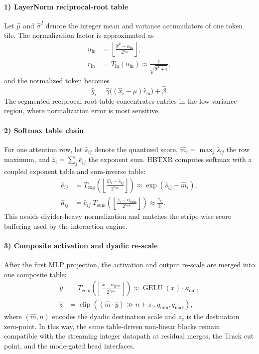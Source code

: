 \documentclass[journal]{IEEEtran}
\begin{document}
\paragraph*{1) LayerNorm reciprocal-root table}
Let $\hat{\mu}$ and $\hat{\sigma}^2$ denote the integer mean and variance accumulators of one token tile. The normalization factor is approximated as
\begin{align}
u_{\mathrm{ln}} &= \left\lfloor \frac{\hat{\sigma}^2-\alpha_{\mathrm{ln}}}{2^{s_{\mathrm{ln}}}} \right\rfloor,\\
\hat r_{\mathrm{ln}} &= T_{\mathrm{ln}}(u_{\mathrm{ln}})
\approx \frac{1}{\sqrt{\hat{\sigma}^2+\epsilon}},
\end{align}
and the normalized token becomes
\begin{equation}
\hat y_i = \hat\gamma \big((\hat x_i-\hat\mu)\hat r_{\mathrm{ln}}\big) + \hat\beta.
\end{equation}
The segmented reciprocal-root table concentrates entries in the low-variance region, where normalization error is most sensitive.

\paragraph*{2) Softmax table chain}
For one attention row, let $\hat s_{ij}$ denote the quantized score, $\hat m_i=\max_j\hat s_{ij}$ the row maximum, and $\hat z_i=\sum_j \hat e_{ij}$ the exponent sum. HBTXR computes softmax with a coupled exponent table and sum-inverse table:
\begin{align}
\hat e_{ij} &=
T_{\exp}\!\left(
\left\lfloor \frac{\hat m_i-\hat s_{ij}}{2^{s_{\exp}}}\right\rfloor
\right)
\approx \exp(\hat s_{ij}-\hat m_i),\\
\hat a_{ij} &= \hat e_{ij}\;
T_{\mathrm{sum}}\!\left(
\left\lfloor \frac{\hat z_i-\alpha_{\mathrm{sum}}}{2^{s_{\mathrm{sum}}}} \right\rfloor
\right)
\approx \frac{\hat e_{ij}}{\hat z_i}.
\end{align}
This avoids divider-heavy normalization and matches the stripe-wise score buffering used by the interaction engine.

\paragraph*{3) Composite activation and dyadic re-scale}
After the first MLP projection, the activation and output re-scale are merged into one composite table:
\begin{align}
\hat y &= T_{\mathrm{gelu}}\!\left(
\left\lfloor \frac{\hat x-\alpha_{\mathrm{gelu}}}{2^{s_{\mathrm{gelu}}}} \right\rfloor
\right)
\approx \operatorname{GELU}(x)\cdot\kappa_{\mathrm{out}},\\
\hat z &= \operatorname{clip}\!\left(\left(\hat m\cdot \hat y\right)\gg n + z_z,
q_{\min},q_{\max}\right),
\end{align}
where $(\hat m,n)$ encodes the dyadic destination scale and $z_z$ is the destination zero-point. In this way, the same table-driven non-linear blocks remain compatible with the streaming integer datapath at residual merges, the Track cut point, and the mode-gated head interfaces.
\end{document}
